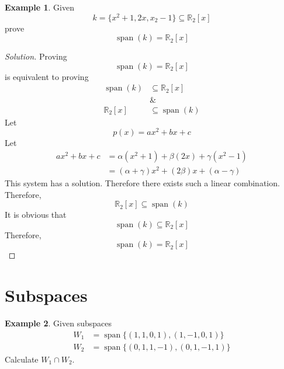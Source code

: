 \documentclass[fleqn, a4paper, 12pt]{article}
\theoremstyle{definition}
\newtheorem{example}{Example}
\theoremstyle{theorem}
\newenvironment{solution}
{\begin{proof}[Solution]\let\qed\relax}
	{\end{proof}}
\DeclareMathOperator{\vspan}{\mathrm{span}} %
\begin{document}
\begin{example}
	Given 
	\begin{equation*}
		k = \{x^2 + 1, 2x, x_2 - 1\} \subseteq \mathbb{R}_2 [x]
	\end{equation*}
	prove 
	\begin{equation*}
		\vspan (k) = \mathbb{R}_2 [x]
	\end{equation*}
\end{example}

\begin{solution}
	Proving
	\begin{equation*}
		\vspan (k) = \mathbb{R}_2 [x]
	\end{equation*}
	is equivalent to proving
	\begin{align*}
		\vspan (k) &\subseteq \mathbb{R}_2 [x]\\
		& \&\\
		\mathbb{R}_2 [x] &\subseteq \vspan (k)
	\end{align*}
	Let
	\begin{equation*}
		p(x) = ax^2 + bx + c
	\end{equation*}
	Let
	\begin{align*}
		ax^2 + bx + c &= \alpha (x^2 + 1) + \beta (2x) + \gamma (x^2 - 1)\\
		&= (\alpha + \gamma) x^2 + (2 \beta) x + (\alpha - \gamma)
	\end{align*}
	This system has a solution. Therefore there exists such a linear combination.\\
	Therefore, 
	\begin{equation*}
		\mathbb{R}_2 [x] \subseteq \vspan (k)
	\end{equation*}
	It is obvious that
	\begin{equation*}
		\vspan (k) \subseteq \mathbb{R}_2 [x]
	\end{equation*}
	Therefore,
	\begin{equation*}
		\vspan (k)  = \mathbb{R}_2 [x]
	\end{equation*}
\end{solution}

\section{Subspaces}

\begin{example}
	Given subspaces
	\begin{align*}
		W_1 &= \vspan \{(1, 1, 0, 1), (1, -1, 0, 1)\}\\
		W_2 &= \vspan \{(0, 1, 1, -1), (0,1, -1, 1)\}
	\end{align*}
	Calculate $W_1 \cap W_2$.
\end{example}
\end{document}
